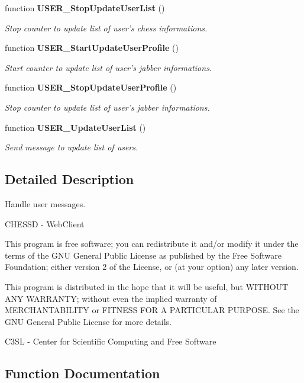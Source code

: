 \begin{CompactItemize}
function {\bf USER\_\-StopUpdateUserList} ()
\begin{CompactList}\small\item\em Stop counter to update list of user's chess informations. \item\end{CompactList}\item 
function {\bf USER\_\-StartUpdateUserProfile} ()
\begin{CompactList}\small\item\em Start counter to update list of user's jabber informations. \item\end{CompactList}\item 
function {\bf USER\_\-StopUpdateUserProfile} ()
\begin{CompactList}\small\item\em Stop counter to update list of user's jabber informations. \item\end{CompactList}\item 
function {\bf USER\_\-UpdateUserList} ()
\begin{CompactList}\small\item\em Send message to update list of users. \item\end{CompactList}\end{CompactItemize}


\subsection{Detailed Description}
Handle user messages. 

CHESSD - WebClient

This program is free software; you can redistribute it and/or modify it under the terms of the GNU General Public License as published by the Free Software Foundation; either version 2 of the License, or (at your option) any later version.

This program is distributed in the hope that it will be useful, but WITHOUT ANY WARRANTY; without even the implied warranty of MERCHANTABILITY or FITNESS FOR A PARTICULAR PURPOSE. See the GNU General Public License for more details.

C3SL - Center for Scientific Computing and Free Software 

\subsection{Function Documentation}

